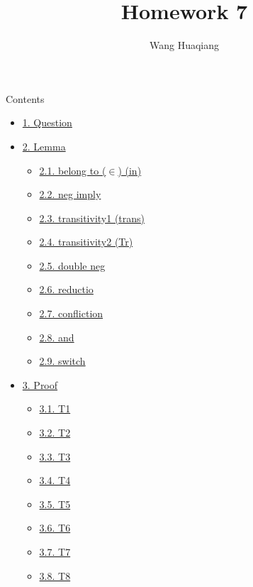 \documentclass{article} %
\title{Homework 7}
\author{Wang Huaqiang}
\providecommand{\tightlist}{%
	\setlength{\itemsep}{0pt}\setlength{\parskip}{0pt}}
\begin{document}
	\maketitle



\begin{Huge}
	\begin{center}
		Contents
	\end{center}
\end{Huge}


\begin{itemize}
\tightlist
\item
  \protect\hyperlink{1-question}{1. Question}
\item
  \protect\hyperlink{2-lemma}{2. Lemma}

  \begin{itemize}
  \tightlist
  \item
    \protect\hyperlink{21-belong-to-ux2fin-in}{2.1. belong to (\(\in\))
    (in)}
  \item
    \protect\hyperlink{22-neg-imply}{2.2. neg imply}
  \item
    \protect\hyperlink{23-transitivity1-trans}{2.3. transitivity1
    (trans)}
  \item
    \protect\hyperlink{24-transitivity2-tr}{2.4. transitivity2 (Tr)}
  \item
    \protect\hyperlink{25-double-neg}{2.5. double neg}
  \item
    \protect\hyperlink{26-reductio}{2.6. reductio}
  \item
    \protect\hyperlink{27-confliction}{2.7. confliction}
  \item
    \protect\hyperlink{28-and}{2.8. and}
  \item
    \protect\hyperlink{29-switch}{2.9. switch}
  \end{itemize}
\item
  \protect\hyperlink{3-proof}{3. Proof}

  \begin{itemize}
  \tightlist
  \item
    \protect\hyperlink{31-t1}{3.1. T1}
  \item
    \protect\hyperlink{32-t2}{3.2. T2}
  \item
    \protect\hyperlink{33-t3}{3.3. T3}
  \item
    \protect\hyperlink{34-t4}{3.4. T4}
  \item
    \protect\hyperlink{35-t5}{3.5. T5}
  \item
    \protect\hyperlink{36-t6}{3.6. T6}
  \item
    \protect\hyperlink{37-t7}{3.7. T7}
  \item
    \protect\hyperlink{38-t8}{3.8. T8}
  \end{itemize}
\end{itemize}
\end{document}
